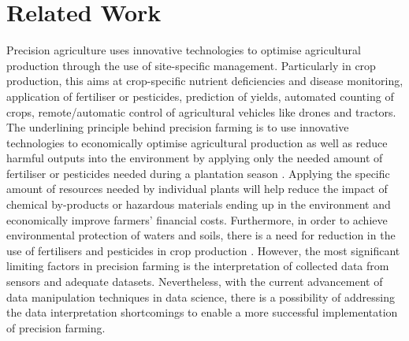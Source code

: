 \chapter{Related Work}\label{cha:RelatedWork}



Precision agriculture uses innovative technologies to optimise agricultural production through the use of site-specific management. Particularly in crop production, this aims at crop-specific nutrient deficiencies and disease monitoring, application of fertiliser or pesticides, prediction of yields, automated counting of crops, remote/automatic control of agricultural vehicles like drones and tractors. The underlining principle behind precision farming is to use innovative technologies to economically optimise agricultural production as well as reduce harmful outputs into the environment by applying only the needed amount of fertiliser or pesticides needed during a plantation season \cite{auernhammer2001precision}. Applying the specific amount of resources needed by individual plants will help reduce the impact of chemical by-products or hazardous materials ending up in the environment and economically improve farmers’ financial costs. Furthermore, in order to achieve environmental protection of waters and soils, there is a need for reduction in the use of fertilisers and pesticides in crop production \cite{otero2005fertiliser}.
However, the most significant limiting factors in precision farming is the interpretation of collected data from sensors \cite{ondoua2017precision} and adequate datasets. Nevertheless, with the current advancement of data manipulation techniques in data science, there is a possibility of addressing the data interpretation shortcomings to enable a more successful implementation of precision farming.

